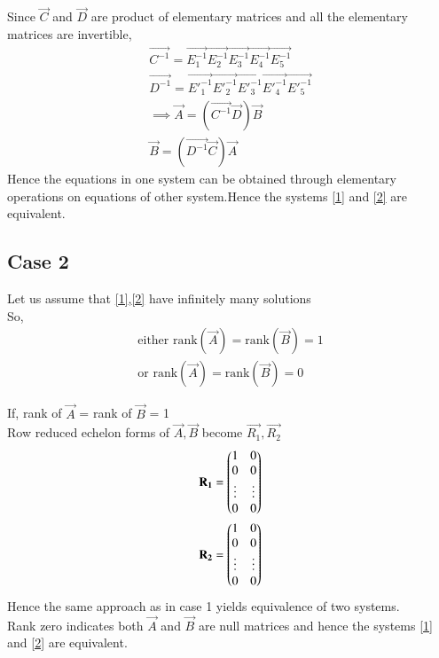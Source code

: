\documentclass[journal,12pt,twocolumn]{IEEEtran}
\begin{document}
Since $\vec{C}$ and  $\vec{D}$ are product of elementary matrices and all the elementary matrices are invertible,
\begin{align}
    \vec{C^{-1}}=\vec{E_1^{-1}}\vec{E_2^{-1}}\vec{E_3^{-1}}\vec{E_4^{-1}}\vec{E_5^{-1}}\\
    \vec{D^{-1}}=\vec{E'_1^{-1}}\vec{E'_2^{-1}}\vec{E'_3^{-1}}\vec{E'_4^{-1}}\vec{E'_5^{-1}} \\
    \implies \vec{A}= (\vec{C^{-1}}\vec{D})\vec{B}\\
    \vec{B}= (\vec{D^{-1}}\vec{C})\vec{A}
\end{align}
Hence the equations in one system can be obtained through elementary operations on equations of other system.Hence the systems \eqref{1} and \eqref{2} are equivalent.

\subsection{Case 2}
Let us assume that \eqref{1},\eqref{2} have infinitely many solutions\\
So,
\begin{align}
\text{either rank}(\vec{A}) = \text{rank}(\vec{B}) = 1 \\
\text{or rank}(\vec{A})= \text{rank}(\vec{B}) = 0
\end{align}

If, rank of $\vec{A}$ = rank of $\vec{B}$ = 1\\
Row reduced echelon forms of $\vec{A},\vec{B}$ become $\vec{R_1},\vec{R_2}$ 
\begin{align}
    \mathbf{R_1}=\begin{pmatrix}1&0\\0&0\\\vdots&\vdots\\0&0\end{pmatrix}\\
    \mathbf{R_2}=\begin{pmatrix}1&0\\0&0\\\vdots&\vdots\\0&0\end{pmatrix}
\end{align}
Hence the same approach as in case 1 yields equivalence of two systems.\\
Rank zero indicates both $\vec{A}$ and $\vec{B}$ are null matrices and hence the systems \eqref{1} and \eqref{2} are equivalent.\\
\end{document}
